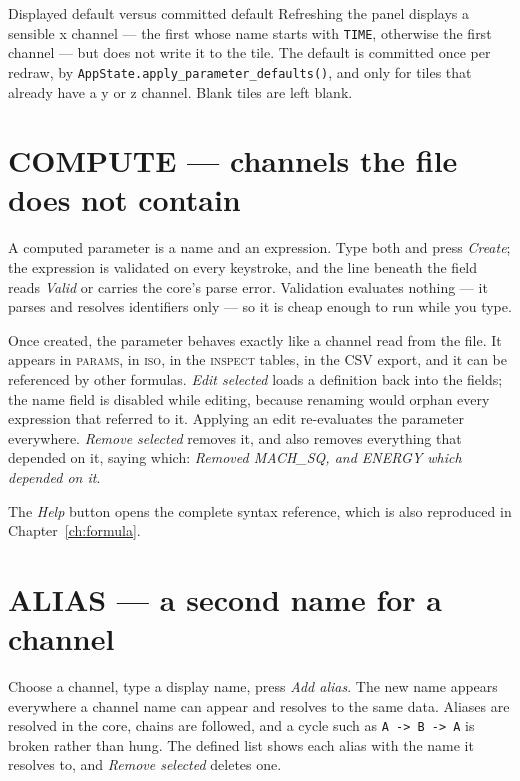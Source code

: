 \documentclass[11pt,a4paper,oneside]{report}
\newcommand{\code}[1]{\texttt{#1}}
\newcommand{\tab}[1]{\textsc{#1}}
\begin{document}
\begin{aoenote}{Displayed default versus committed default}
Refreshing the panel displays a sensible x channel --- the first whose name
starts with \code{TIME}, otherwise the first channel --- but does not write it to
the tile. The default is committed once per redraw, by
\code{AppState.apply\_parameter\_defaults()}, and only for tiles that already
have a y or z channel. Blank tiles are left blank.
\end{aoenote}

\section{COMPUTE --- channels the file does not contain}

A computed parameter is a name and an expression. Type both and press
\emph{Create}; the expression is validated on every keystroke, and the line
beneath the field reads \emph{Valid} or carries the core's parse error.
Validation evaluates nothing --- it parses and resolves identifiers only --- so
it is cheap enough to run while you type.

Once created, the parameter behaves exactly like a channel read from the file.
It appears in \tab{params}, in \tab{iso}, in the \tab{inspect} tables, in the CSV
export, and it can be referenced by other formulas. \emph{Edit selected} loads a
definition back into the fields; the name field is disabled while editing,
because renaming would orphan every expression that referred to it. Applying an
edit re-evaluates the parameter everywhere. \emph{Remove selected} removes it,
and also removes everything that depended on it, saying which: \emph{Removed
MACH\_SQ, and ENERGY which depended on it}.

The \emph{Help} button opens the complete syntax reference, which is also
reproduced in Chapter~\ref{ch:formula}.

\section{ALIAS --- a second name for a channel}

Choose a channel, type a display name, press \emph{Add alias}. The new name
appears everywhere a channel name can appear and resolves to the same data.
Aliases are resolved in the core, chains are followed, and a cycle such as
\code{A -> B -> A} is broken rather than hung. The defined list shows each alias
with the name it resolves to, and \emph{Remove selected} deletes one.
\end{document}
